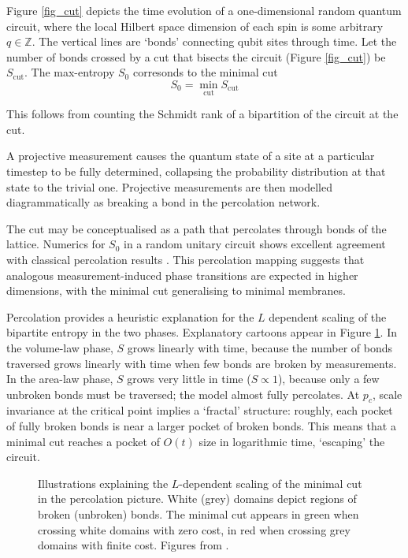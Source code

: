 \documentclass[10pt]{article}
\begin{document}
Figure \ref{fig_cut} depicts the time evolution of a one-dimensional random quantum circuit, where the local Hilbert space dimension of each spin is some arbitrary $q \in \mathbb{Z}$. The vertical lines are `bonds' connecting qubit sites through time. Let the number of bonds crossed by a cut that bisects the circuit (Figure \ref{fig_cut}) be $S_\text{cut}$. The max-entropy $S_0$ corresonds to the minimal cut
\begin{equation}
S_0 = \min_\text{cut} S_\text{cut}
\end{equation}

This follows from counting the Schmidt rank of a bipartition of the circuit at the cut.

A projective measurement causes the quantum state of a site at a particular timestep to be fully determined, collapsing the probability distribution at that state to the trivial one. Projective measurements are then modelled diagrammatically as breaking a bond in the percolation network.

The cut may be conceptualised as a path that percolates through bonds of the lattice. Numerics for $S_0$ in a random unitary circuit shows excellent agreement with classical percolation results \cite{skinner2019measurement}. This percolation mapping suggests that analogous measurement-induced phase transitions are expected in higher dimensions, with the minimal cut generalising to minimal membranes.

Percolation provides a heuristic explanation for the $L$ dependent scaling of the bipartite entropy in the two phases. Explanatory cartoons appear in Figure \ref{fig_perc}. In the volume-law phase, $S$ grows linearly with time, because the number of bonds traversed grows linearly with time when few bonds are broken by measurements. In the area-law phase, $S$ grows very little in time ($S \propto 1$), because only a few unbroken bonds must be traversed; the model almost fully percolates. At $p_c$, scale invariance at the critical point implies a `fractal' structure: roughly, each pocket of fully broken bonds is near a larger pocket of broken bonds. This means that a minimal cut reaches a pocket of $O(t)$ size in logarithmic time, `escaping' the circuit. 

\begin{figure}
\centering
{}
\caption{Illustrations explaining the $L$-dependent scaling of the minimal cut in the percolation picture. White (grey) domains depict regions of broken (unbroken) bonds. The minimal cut appears in green when crossing white domains with zero cost, in red when crossing grey domains with finite cost. Figures from \cite{skinner2019measurement}.}
\label{fig_perc}
\end{figure}
\end{document}
